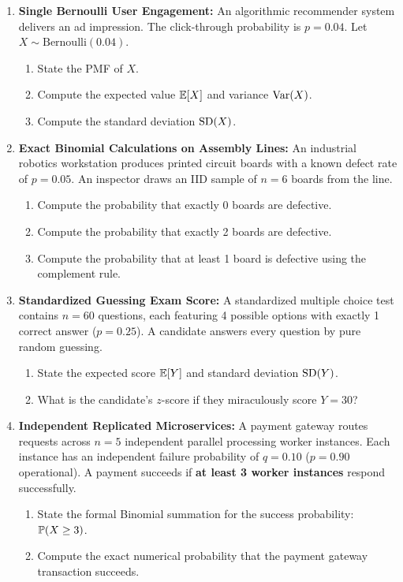 \begin{enumerate}
    \item \textbf{Single Bernoulli User Engagement:} An algorithmic recommender system delivers an ad impression. The click-through probability is $p = 0.04$. Let $X \sim \text{Bernoulli}(0.04)$.
    \begin{enumerate}
        \item State the PMF of $X$.
        \item Compute the expected value $\E[X]$ and variance $\Var(X)$.
        \item Compute the standard deviation $\SD(X)$.
    \end{enumerate}

    \item \textbf{Exact Binomial Calculations on Assembly Lines:} An industrial robotics workstation produces printed circuit boards with a known defect rate of $p = 0.05$. An inspector draws an IID sample of $n = 6$ boards from the line.
    \begin{enumerate}
        \item Compute the probability that exactly 0 boards are defective.
        \item Compute the probability that exactly 2 boards are defective.
        \item Compute the probability that at least 1 board is defective using the complement rule.
    \end{enumerate}

    \item \textbf{Standardized Guessing Exam Score:} A standardized multiple choice test contains $n = 60$ questions, each featuring 4 possible options with exactly 1 correct answer ($p = 0.25$). A candidate answers every question by pure random guessing.
    \begin{enumerate}
        \item State the expected score $\E[Y]$ and standard deviation $\SD(Y)$.
        \item What is the candidate's $z$-score if they miraculously score $Y = 30$?
    \end{enumerate}

    \item \textbf{Independent Replicated Microservices:} A payment gateway routes requests across $n = 5$ independent parallel processing worker instances. Each instance has an independent failure probability of $q = 0.10$ ($p = 0.90$ operational). A payment succeeds if \textbf{at least 3 worker instances} respond successfully.
    \begin{enumerate}
        \item State the formal Binomial summation for the success probability: $\P(X \ge 3)$.
        \item Compute the exact numerical probability that the payment gateway transaction succeeds.
    \end{enumerate}


\end{enumerate}

